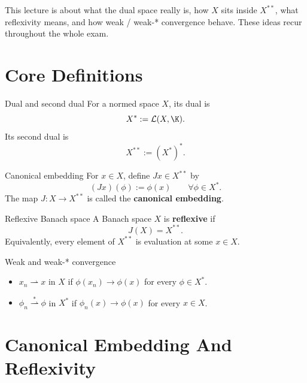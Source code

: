 \documentclass[header={Lecture 4 Exam Study Notes}]{study-note}
\begin{document}

\vspace{0.8em}

\begin{focusbox}
This lecture is about what the dual space really is, how $X$ sits inside $X^{**}$, what reflexivity means, and how weak / weak-* convergence behave. These ideas recur throughout the whole exam.
\end{focusbox}

\tableofcontents

\section{Core Definitions}

\begin{defbox}{Dual and second dual}
For a normed space $X$, its dual is
\[
X^*:=\mathcal L(X,\K).
\]
Its second dual is
\[
X^{**}:=(X^*)^*.
\]
\end{defbox}

\begin{defbox}{Canonical embedding}
For $x\in X$, define $Jx\in X^{**}$ by
\[
(Jx)(\phi):=\phi(x)
\qquad \forall \phi\in X^*.
\]
The map $J:X\to X^{**}$ is called the \textbf{canonical embedding}.
\end{defbox}

\begin{defbox}{Reflexive Banach space}
A Banach space $X$ is \textbf{reflexive} if
\[
J(X)=X^{**}.
\]
Equivalently, every element of $X^{**}$ is evaluation at some $x\in X$.
\end{defbox}

\begin{defbox}{Weak and weak-* convergence}
\begin{itemize}
\item $x_n\rightharpoonup x$ in $X$ if $\phi(x_n)\to \phi(x)$ for every $\phi\in X^*$.
\item $\phi_n\overset{*}{\rightharpoonup}\phi$ in $X^*$ if $\phi_n(x)\to \phi(x)$ for every $x\in X$.
\end{itemize}
\end{defbox}

\section{Canonical Embedding And Reflexivity}
\end{document}
